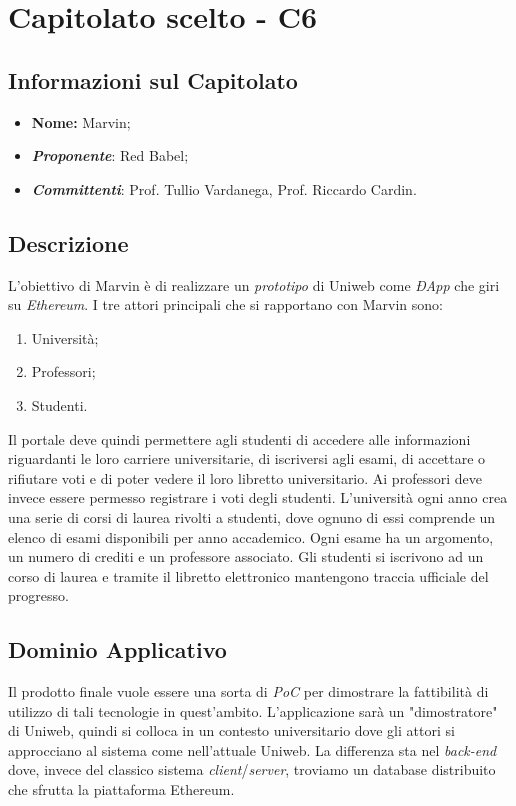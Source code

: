 \newpage
\section{Capitolato scelto - C6}
\subsection{Informazioni sul Capitolato}
\begin{itemize}
	\item \textbf{Nome:} Marvin;
	\item \textbf{\textit{Proponente}}: Red Babel;
	\item \textbf{\textit{Committenti}}: Prof. Tullio Vardanega, Prof. Riccardo Cardin.
\end{itemize}

\subsection{Descrizione}
L'obiettivo di Marvin è di realizzare un \textit{prototipo} di Uniweb come \textit{ÐApp} che giri su \textit{Ethereum}. I tre attori principali che si rapportano con Marvin sono:
\begin{enumerate}
	\item Università;
	\item Professori;
	\item Studenti.
\end{enumerate}
Il portale deve quindi permettere agli studenti di accedere alle informazioni riguardanti le loro carriere universitarie, di iscriversi agli esami, di accettare o rifiutare voti e di poter vedere il loro libretto universitario.
Ai professori deve invece essere permesso registrare i voti degli studenti.
L'università ogni anno crea una serie di corsi di laurea rivolti a studenti, dove ognuno di essi comprende un elenco di esami disponibili per anno accademico. Ogni esame ha un argomento, un numero di crediti e un professore associato. Gli studenti si iscrivono ad un corso di laurea e tramite il libretto elettronico mantengono traccia ufficiale del progresso.

\subsection{Dominio Applicativo}
Il prodotto finale vuole essere una sorta di \textit{PoC} per dimostrare la fattibilità di utilizzo di tali tecnologie in quest'ambito. L'applicazione sarà un "dimostratore" di Uniweb, quindi si colloca in un contesto universitario dove gli attori si approcciano al sistema come nell'attuale Uniweb. La differenza sta nel \textit{back-end} dove, invece del classico sistema \textit{client}/\textit{server}, troviamo un database distribuito che sfrutta la piattaforma Ethereum. 

